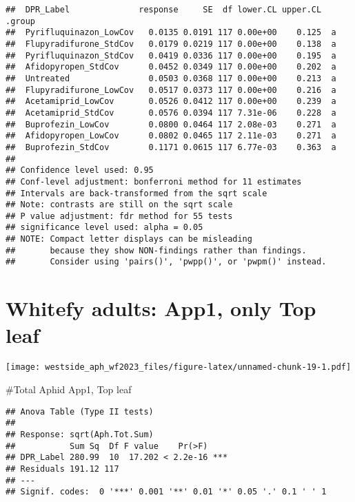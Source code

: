 \documentclass[
]{article}
\begin{document}
\begin{verbatim}
##  DPR_Label              response     SE  df lower.CL upper.CL .group
##  Pyrifluquinazon_LowCov   0.0135 0.0191 117 0.00e+00    0.125  a    
##  Flupyradifurone_StdCov   0.0179 0.0219 117 0.00e+00    0.138  a    
##  Pyrifluquinazon_StdCov   0.0419 0.0336 117 0.00e+00    0.195  a    
##  Afidopyropen_StdCov      0.0452 0.0349 117 0.00e+00    0.202  a    
##  Untreated                0.0503 0.0368 117 0.00e+00    0.213  a    
##  Flupyradifurone_LowCov   0.0517 0.0373 117 0.00e+00    0.216  a    
##  Acetamiprid_LowCov       0.0526 0.0412 117 0.00e+00    0.239  a    
##  Acetamiprid_StdCov       0.0576 0.0394 117 7.31e-06    0.228  a    
##  Buprofezin_LowCov        0.0800 0.0464 117 2.08e-03    0.271  a    
##  Afidopyropen_LowCov      0.0802 0.0465 117 2.11e-03    0.271  a    
##  Buprofezin_StdCov        0.1171 0.0615 117 6.77e-03    0.363  a    
## 
## Confidence level used: 0.95 
## Conf-level adjustment: bonferroni method for 11 estimates 
## Intervals are back-transformed from the sqrt scale 
## Note: contrasts are still on the sqrt scale 
## P value adjustment: fdr method for 55 tests 
## significance level used: alpha = 0.05 
## NOTE: Compact letter displays can be misleading
##       because they show NON-findings rather than findings.
##       Consider using 'pairs()', 'pwpp()', or 'pwpm()' instead.
\end{verbatim}

\hypertarget{whitefy-adults-app1-only-top-leaf}{%
\section{Whitefy adults: App1, only Top
leaf}\label{whitefy-adults-app1-only-top-leaf}}

\texttt{[image: westside\_aph\_wf2023\_files/figure-latex/unnamed-chunk-19-1.pdf]}

\#Total Aphid App1, Top leaf

\begin{verbatim}
## Anova Table (Type II tests)
## 
## Response: sqrt(Aph.Tot.Sum)
##           Sum Sq  Df F value    Pr(>F)    
## DPR_Label 280.99  10  17.202 < 2.2e-16 ***
## Residuals 191.12 117                      
## ---
## Signif. codes:  0 '***' 0.001 '**' 0.01 '*' 0.05 '.' 0.1 ' ' 1
\end{verbatim}
\end{document}
